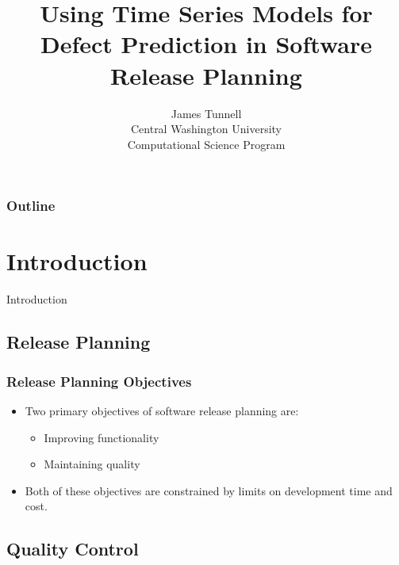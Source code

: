 \documentclass[presentation]{beamer}
\begin{document}
\title{Using Time Series Models for Defect Prediction in Software Release Planning}
\author{James Tunnell \\
Central Washington University \\
Computational Science Program}

\begin{frame}
\titlepage
\end{frame}

\begin{frame}
\frametitle{Outline}
\tableofcontents
\end{frame}

\section{Introduction}

\begin{frame}
\begin{center}
\Large{Introduction}
\end{center}
\end{frame}

\subsection{Release Planning}

\begin{frame}[t]
\frametitle{Release Planning Objectives}
\begin{itemize}
\item{Two primary objectives of software release planning are:
  \begin{itemize}
    \item{Improving functionality}
    \item{Maintaining quality}
  \end{itemize}}
  \item{Both of these objectives are constrained by limits on development time and cost.}
\end{itemize}
\end{frame}

\subsection{Quality Control}
\end{document}
